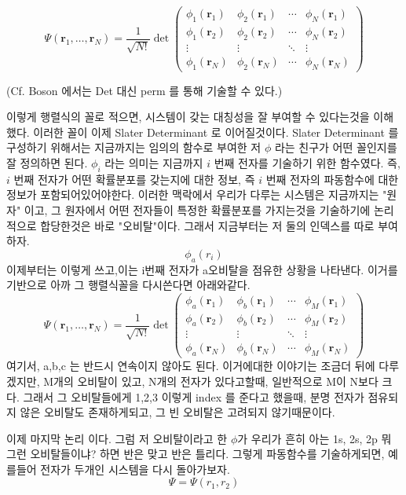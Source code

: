 \documentclass[11pt]{article}
\begin{document}
\[
\Psi(\mathbf{r}_1, \dots, \mathbf{r}_N) 
= \frac{1}{\sqrt{N!}} \det \begin{pmatrix}
\phi_1(\mathbf{r}_1) & \phi_2(\mathbf{r}_1) & \cdots & \phi_N(\mathbf{r}_1) \\
\phi_1(\mathbf{r}_2) & \phi_2(\mathbf{r}_2) & \cdots & \phi_N(\mathbf{r}_2) \\
\vdots & \vdots & \ddots & \vdots \\
\phi_1(\mathbf{r}_N) & \phi_2(\mathbf{r}_N) & \cdots & \phi_N(\mathbf{r}_N)
\end{pmatrix}
\]
\begin{center}
(Cf. Boson 에서는 Det 대신 perm 를 통해 기술할 수 있다.)
\end{center}

이렇게 행렬식의 꼴로 적으면, 시스템이 갖는 대칭성을 잘 부여할 수 있다는것을 이해했다. 이러한 꼴이 이제 Slater Determinant 로 이어질것이다. 
Slater Determinant 를 구성하기 위해서는 지금까지는 임의의 함수로 부여한 저 \(\phi\) 라는 친구가 어떤 꼴인지를 잘 정의하면 된다. 
\(\phi_i\) 라는 의미는 지금까지 \(i\) 번째 전자를 기술하기 위한 함수였다. 즉, \(i\) 번째 전자가 어떤 확률분포를 갖는지에 대한 정보, 즉 \(i\) 번째 전자의 파동함수에 대한 정보가 포함되어있어야한다. 
이러한 맥락에서 우리가 다루는 시스템은 지금까지는 "원자" 이고, 그 원자에서 어떤 전자들이 특정한 확률분포를 가지는것을 기술하기에 논리적으로 합당한것은 바로 "오비탈"이다. 
그래서 지금부터는 저 둘의 인덱스를 따로 부여하자. 
\[\phi_a(r_i)\]
이제부터는 이렇게 쓰고,이는 i번째 전자가 a오비탈을 점유한 상황을 나타낸다. 이거를 기반으로 아까 그 행렬식꼴을 다시쓴다면 아래와같다. 
\[
\Psi(\mathbf{r}_1, \dots, \mathbf{r}_N) 
= \frac{1}{\sqrt{N!}} \det \begin{pmatrix}
\phi_a(\mathbf{r}_1) & \phi_b(\mathbf{r}_1) & \cdots & \phi_M(\mathbf{r}_1) \\
\phi_a(\mathbf{r}_2) & \phi_b(\mathbf{r}_2) & \cdots & \phi_M(\mathbf{r}_2) \\
\vdots & \vdots & \ddots & \vdots \\
\phi_a(\mathbf{r}_N) & \phi_b(\mathbf{r}_N) & \cdots & \phi_M(\mathbf{r}_N)
\end{pmatrix}
\]
여기서, a,b,c 는 반드시 연속이지 않아도 된다. 
이거에대한 이야기는 조금더 뒤에 다루겠지만, M개의 오비탈이 있고, N개의 전자가 있다고할때, 일반적으로 M이 N보다 크다. 
그래서 그 오비탈들에게 1,2,3 이렇게 index 를 준다고 했을때, 분명 전자가 점유되지 않은 오비탈도 존재하게되고, 그 빈 오비탈은 고려되지 않기때문이다. 

이제 마지막 논리 이다. 그럼 저 오비탈이라고 한 \(\phi\)가 우리가 흔히 아는 1s, 2s, 2p 뭐 그런 오비탈들이냐? 하면 반은 맞고 반은 틀리다.
그렇게 파동함수를 기술하게되면, 예를들어 전자가 두개인 시스템을 다시 돌아가보자. 
\[
\Psi = \Psi(r_1,r_2)
\]
\end{document}
